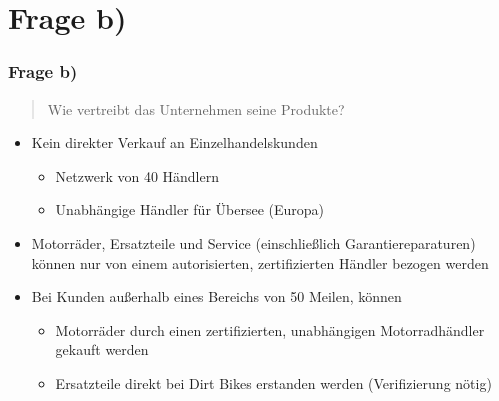 \documentclass{beamer}
\begin{document}
\section{Frage b)}
\begin{frame}
\frametitle{Frage b)}

\begin{quote}
Wie vertreibt das Unternehmen seine Produkte?
\end{quote}

\begin{itemize}
\setlength{\itemsep}{14pt}
\item Kein direkter Verkauf an Einzelhandelskunden
\begin{itemize}
\item Netzwerk von 40 H\"andlern
\item Unabh\"angige H\"andler f\"ur \"Ubersee (Europa)
\end{itemize}
\item Motorr\"ader, Ersatzteile und Service (einschließlich Garantiereparaturen) können nur von einem autorisierten, zertifizierten H\"andler bezogen werden
\item Bei Kunden außerhalb eines Bereichs von 50 Meilen, k\"onnen 
\begin{itemize}
\item Motorr\"ader durch einen zertifizierten, unabhängigen Motorradh\"andler gekauft werden
\item Ersatzteile direkt bei Dirt Bikes erstanden werden (Verifizierung n\"otig)
\end{itemize}
\end{itemize}

\end{frame}
\end{document}

